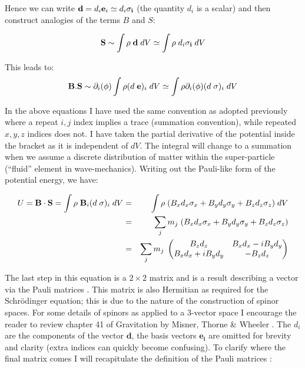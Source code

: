 Hence we can write $\mathbf{d}= d_i\mathbf{e}_i \simeq d_i {\bf \sigma_i}$ (the quantity $d_i$ is a scalar) and then construct analogies of the terms $B$ and $S$:

\begin{equation}
{\bf S} \sim \int \rho \;{\bf d}\;dV \simeq \int \rho\; d_i {\bf \sigma_i} \;dV 
\end{equation}

\noindent This leads to:
\begin{equation}
{\bf B}.{\bf S} \sim \partial_i(\phi) \int \rho (d \; {\bf e})_i \;dV \simeq \int \rho \partial_i(\phi) (d \; \sigma)_i \;dV 
\end{equation}

\noindent In the above equations I have used the same convention as adopted previously where a repeat $i, j$ index implies a trace (summation convention), while repeated $x,y,z$ indices does not. I have taken the partial derivative of the potential inside the bracket as it is independent of $dV$. The integral will change to a summation when we assume a discrete distribution of matter within the super-particle (``fluid'' element in wave-mechanics). Writing out the Pauli-like form of the potential energy, we have:

\begin{eqnarray}
\label{pdipole}
U = {\bf B}\cdot{\bf S} = \int \rho\; {\bf B}_i (d \; \sigma)_i \;dV &=& \int \rho\; (B_x d_x\sigma_x + B_y d_y\sigma_y + B_z d_z\sigma_z) \;dV \\
 &=& \sum_j m_j\; (B_x d_x\sigma_x + B_y d_y\sigma_y + B_z d_z\sigma_z) \\
 &=& \sum_j m_j\;\begin{pmatrix}
B_z d_z & B_x d_x - i B_y d_y\\
B_x d_x + i B_y d_y & - B_z d_z
\end{pmatrix}
\end{eqnarray}

\noindent The last step in this equation is a $2\times 2$ matrix and is a result describing a vector via the Pauli matrices \citep{bib_lou}. This matrix is also Hermitian as required for the Schr\"odinger equation; this is due to the nature of the construction of spinor spaces. For some details of spinors as applied to a 3-vector space I encourage the reader to review chapter 41 of Gravitation by Misner, Thorne \& Wheeler \citep{bib_grav}. The $d_i$ are the components of the vector $\mathbf{d}$, the basis vectors $\mathbf{e_i}$ are omitted for brevity and clarity (extra indices can quickly become confusing). To clarify where the final matrix comes I will recapitulate the definition of the Pauli matrices \citep{bib_lou}:


